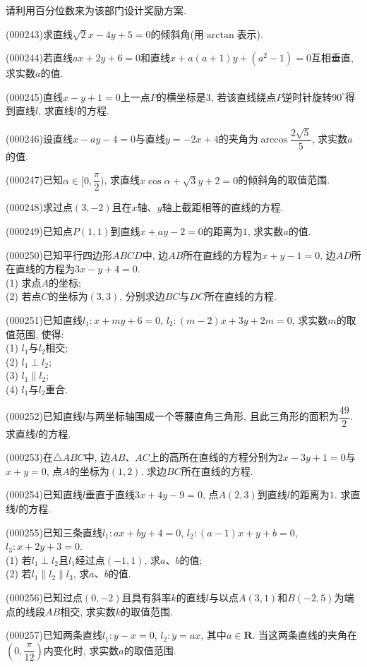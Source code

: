 请利用百分位数来为该部门设计奖励方案.
\item (000243)求直线$\sqrt 2x-4y+5=0$的倾斜角(用$\arctan$表示).
\item (000244)若直线$ax+2y+6=0$和直线$x+a(a+1)y+(a^2-1)=0$互相垂直, 求实数$a$的值.
\item (000245)直线$x-y+1=0$上一点$P$的横坐标是$3$, 若该直线绕点$P$逆时针旋转$90^\circ$得到直线$l$, 求直线$l$的方程.
\item (000246)设直线$x-ay-4=0$与直线$y=-2x+4$的夹角为$\arccos \dfrac{2\sqrt 5}5$, 求实数$a$的值.
\item (000247)已知$\alpha\in [0, \dfrac\pi 2)$, 求直线$x\cos \alpha+\sqrt 3y+2=0$的倾斜角的取值范围.
\item (000248)求过点$(3, -2)$且在$x$轴、$y$轴上截距相等的直线的方程.
\item (000249)已知点$P(1, 1)$到直线$x+ay-2=0$的距离为$1$, 求实数$a$的值.
\item (000250)已知平行四边形$ABCD$中, 边$AB$所在直线的方程为$x+y-1=0$, 边$AD$所在直线的方程为$3x-y+4=0$.\\
(1) 求点$A$的坐标;\\
(2) 若点$C$的坐标为$(3, 3)$, 分别求边$BC$与$DC$所在直线的方程.
\item (000251)已知直线$l_1: x+my+6=0$, $l_2: (m-2)x+3y+2m=0$, 求实数$m$的取值范围, 使得:\\
(1) $l_1$与$l_2$相交;\\
(2) $l_1\perp l_2$;\\
(3) $l_1\parallel l_2$;\\
(4) $l_1$与$l_2$重合.
\item (000252)已知直线$l$与两坐标轴围成一个等腰直角三角形, 且此三角形的面积为$\dfrac{49}2$. 求直线$l$的方程.
\item (000253)在$\triangle ABC$中, 边$AB$、$AC$上的高所在直线的方程分别为$2x-3y+1=0$与$x+y=0$, 点$A$的坐标为$(1, 2)$. 求边$BC$所在直线的方程.
\item (000254)已知直线$l$垂直于直线$3x+4y-9=0$, 点$A(2, 3)$到直线$l$的距离为$1$. 求直线$l$的方程.
\item (000255)已知三条直线$l_1: ax+by+4=0$, $l_2: (a-1)x+y+b=0$, $l_3: x+2y+3=0$.\\
(1) 若$l_1\perp l_2$且$l_1$经过点$(-1, 1)$, 求$a$、$b$的值;\\
(2) 若$l_1\parallel l_2\parallel l_3$, 求$a$、$b$的值.
\item (000256)已知过点$(0, -2)$且具有斜率$k$的直线$l$与以点$A(3, 1)$和$B(-2, 5)$为端点的线段$AB$相交, 求实数$k$的取值范围.
\item (000257)已知两条直线$l_1: y-x=0$, $l_2: y=ax$, 其中$a\in \mathbf{R}$. 当这两条直线的夹角在$(0, \dfrac{\pi}{12})$内变化时, 求实数$a$的取值范围.
